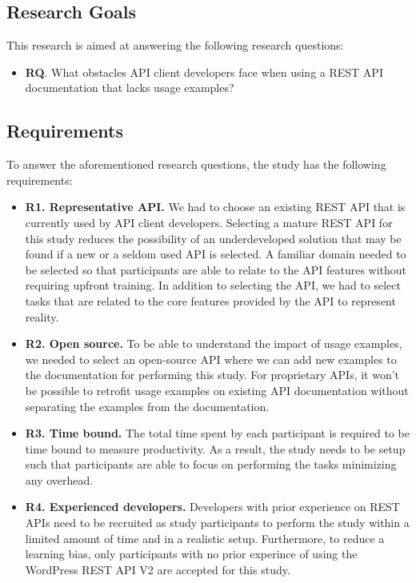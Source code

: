 \documentclass[conference]{IEEEtran}
\begin{document}
\subsection{Research Goals}

This research is aimed at answering the following research questions:

\begin{itemize}
  \item \textbf{RQ}. What obstacles API client developers face when using a REST API documentation that lacks usage examples?
\end{itemize}

\subsection{Requirements} %

To answer the aforementioned research questions, the study has the following requirements:

\begin{itemize}
  \item \textbf{R1. Representative API.} We had to choose an existing REST API that is currently used by API client developers. Selecting a mature REST API for this study reduces the possibility of an underdeveloped solution that may be found if a new or a seldom used API is selected. A familiar domain needed to be selected so that participants are able to relate to the API features without requiring upfront training. In addition to selecting the API, we had to select tasks that are related to the core features provided by the API to represent reality.
  \item \textbf{R2. Open source.} To be able to understand the impact of usage examples, we needed to select an open-source API where we can add new examples to the documentation for performing this study. For proprietary APIs, it won't be possible to retrofit usage examples on existing API documentation without separating the examples from the documentation.
  \item \textbf{R3. Time bound.} The total time spent by each participant is required to be time bound to measure productivity. As a result, the study needs to be setup such that participants are able to focus on performing the tasks minimizing any overhead.
  \item \textbf{R4. Experienced developers.} Developers with prior experience on REST APIs need to be recruited as study participants to perform the study within a limited amount of time and in a realistic setup. Furthermore, to reduce a learning bias, only participants with no prior experince of using the WordPress REST API V2 are accepted for this study.
\end{itemize}
\end{document}
